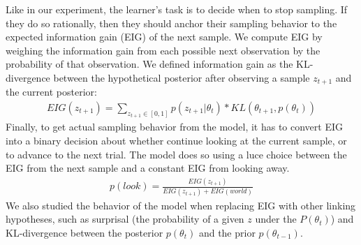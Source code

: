\documentclass[
]{article}
\begin{document}
Like in our experiment, the learner's task is to decide when to stop
sampling. If they do so rationally, then they should anchor their
sampling behavior to the expected information gain (EIG) of the next
sample. We compute EIG by weighing the information gain from each
possible next observation by the probability of that observation. We
defined information gain as the KL-divergence between the hypothetical
posterior after observing a sample \(z_{t+1}\) and the current
posterior: \begin{eqnarray}
EIG(z_{t+1}) = \sum_{z_{t+1} \in [0,1]} p(z_{t+1}|\theta_t) * KL(\theta_{t+1}, p(\theta_t))
\end{eqnarray} Finally, to get actual sampling behavior from the model,
it has to convert EIG into a binary decision about whether continue
looking at the current sample, or to advance to the next trial. The
model does so using a luce choice between the EIG from the next sample
and a constant EIG from looking away. \begin{eqnarray}
p(look) = \frac{EIG(z_{t+1})}{EIG(z_{t+1})+EIG(world)}
\end{eqnarray} We also studied the behavior of the model when replacing
EIG with other linking hypotheses, such as surprisal (the probability of
a given \(z\) under the \(P(\theta_t)\)) and KL-divergence between the
posterior \(p(\theta_t)\) and the prior \(p(\theta_{t-1})\).
\end{document}
